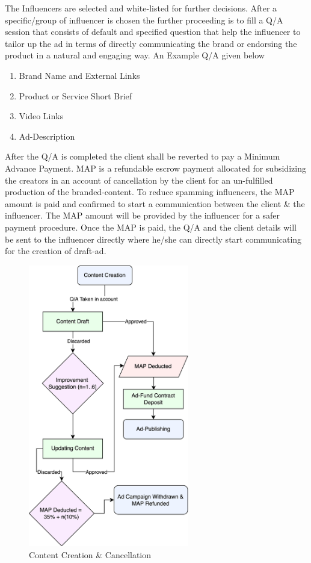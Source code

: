 \documentclass[10pt]{article}
\begin{document}
The Influencers are selected and white-listed for further decisions. After a specific/group of influencer is chosen the further proceeding is to fill a Q/A session that consists of default and specified question that help the influencer to tailor up the ad in terms of directly communicating the brand or endorsing the product in a natural and engaging way. An Example Q/A given below
\begin{enumerate}[leftmargin=+0.2in]
\item Brand Name and External Links
\item Product or Service Short Brief
\item Video Links
\item Ad-Description
\end{enumerate}
After the Q/A is completed the client shall be reverted to pay a Minimum Advance Payment. MAP is a refundable escrow payment allocated for subsidizing the creators in an account of cancellation by the client for an un-fulfilled production of the branded-content. To reduce spamming influencers, the MAP amount is paid and confirmed to start a communication between the client \& the influencer. The MAP amount will be provided by the influencer for a safer payment procedure. Once the MAP is paid, the Q/A and the client details will be sent to the influencer directly where he/she can directly start communicating for the creation of draft-ad.

\begin{figure}[H]
\begin{center}
\includegraphics[width=7cm]{ad-content}
\caption{Content Creation \& Cancellation}
\end{center}
\end{figure}
\end{document}

